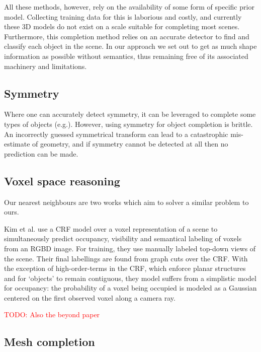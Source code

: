 \documentclass[10pt,twocolumn,letterpaper]{article}
\makeatletter
\renewcommand*{\eg}{e.g.\@\xspace}
\newcommand*{\ea}{et al.\@\xspace}
\newcommand{\todo}[1]{\textcolor{red}{TODO: #1}}
\makeatother
\begin{document}
All these methods, however, rely on the availability of some form of specific prior model.
Collecting training data for this is laborious and costly, and currently these 3D models do not exist on a scale suitable for completing most scenes.
Furthermore, this completion method relies on an accurate detector to find and classify each object in the scene.
In our approach we set out to get as much shape information as possible without semantics, thus remaining free of its associated machinery and limitations.



\subsection{Symmetry}
Where one can accurately detect symmetry, it can be leveraged to complete some types of objects (\eg \cite{law-cviu-2010, thrun-iccv-2005, kroemer-humanoids-2012}). 
However, using symmetry for object completion is brittle.
An incorrectly guessed symmetrical transform can lead to a catastrophic mis-estimate of geometry, and if symmetry cannot be detected at all then no prediction can be made.


\subsection{Voxel space reasoning}

Our nearest neighbours are two works which aim to solver a similar problem to ours.

Kim \ea \cite{kim-iccv-2013} use a CRF model over a voxel representation of a scene to simultaneously predict occupancy, visibility and semantical labeling of voxels from an RGBD image. 
For training, they use manually labeled top-down views of the scene.
Their final labellings are found from graph cuts over the CRF.
With the exception of high-order-terms in the CRF, which enforce planar structures and for `objects' to remain contiguous, they model suffers from a simplistic model for occupancy: the probability of a voxel being occupied is modeled as a Gaussian centered on the first observed voxel along a camera ray.

\todo{Also the beyond paper}



\subsection{Mesh completion}
\end{document}

